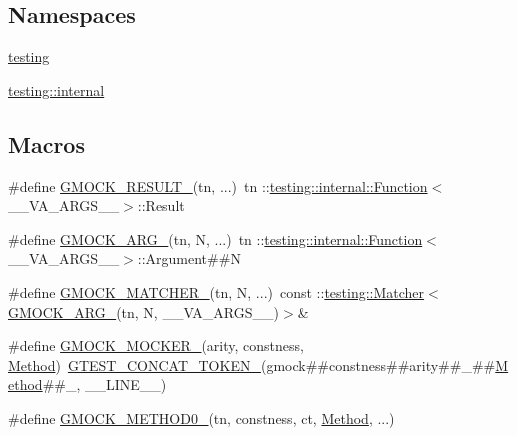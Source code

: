 \subsection*{Namespaces}
\begin{DoxyCompactItemize}
\item 
 \hyperlink{namespacetesting}{testing}
\item 
 \hyperlink{namespacetesting_1_1internal}{testing\+::internal}
\end{DoxyCompactItemize}
\subsection*{Macros}
\begin{DoxyCompactItemize}
\item 
\#define \hyperlink{gmock-generated-function-mockers_8h_a0e9d94e9c77df84f1103af06feee1077}{G\+M\+O\+C\+K\+\_\+\+R\+E\+S\+U\+L\+T\+\_\+}(tn, ...)~tn \+::\hyperlink{structtesting_1_1internal_1_1_function}{testing\+::internal\+::\+Function}$<$\+\_\+\+\_\+\+V\+A\+\_\+\+A\+R\+G\+S\+\_\+\+\_\+$>$\+::Result
\item 
\#define \hyperlink{gmock-generated-function-mockers_8h_a887575cc1c31158fba808180a10c004f}{G\+M\+O\+C\+K\+\_\+\+A\+R\+G\+\_\+}(tn,  N, ...)~tn \+::\hyperlink{structtesting_1_1internal_1_1_function}{testing\+::internal\+::\+Function}$<$\+\_\+\+\_\+\+V\+A\+\_\+\+A\+R\+G\+S\+\_\+\+\_\+$>$\+::Argument\#\#N
\item 
\#define \hyperlink{gmock-generated-function-mockers_8h_aa87d0009fe91f1c89d658776b55a769c}{G\+M\+O\+C\+K\+\_\+\+M\+A\+T\+C\+H\+E\+R\+\_\+}(tn,  N, ...)~const \+::\hyperlink{classtesting_1_1_matcher}{testing\+::\+Matcher}$<$\hyperlink{gmock-generated-function-mockers_8h_a887575cc1c31158fba808180a10c004f}{G\+M\+O\+C\+K\+\_\+\+A\+R\+G\+\_\+}(tn, N, \+\_\+\+\_\+\+V\+A\+\_\+\+A\+R\+G\+S\+\_\+\+\_\+)$>$\&
\item 
\#define \hyperlink{gmock-generated-function-mockers_8h_a7d362499e27b1bc3a9806dd3cf58a5b7}{G\+M\+O\+C\+K\+\_\+\+M\+O\+C\+K\+E\+R\+\_\+}(arity,  constness,  \hyperlink{gmock-spec-builders__test_8cc_a95606368148f3e5aab5db46c32466afd}{Method})~\hyperlink{gtest-internal_8h_ae3c336cbe1ae2bd1b1d019333e4428a0}{G\+T\+E\+S\+T\+\_\+\+C\+O\+N\+C\+A\+T\+\_\+\+T\+O\+K\+E\+N\+\_\+}(gmock\#\#constness\#\#arity\#\#\+\_\+\#\#\hyperlink{gmock-spec-builders__test_8cc_a95606368148f3e5aab5db46c32466afd}{Method}\#\#\+\_\+, \+\_\+\+\_\+\+L\+I\+N\+E\+\_\+\+\_\+)
\item 
\#define \hyperlink{gmock-generated-function-mockers_8h_ae0d290ffa58d7c624b2e3487ba1252f4}{G\+M\+O\+C\+K\+\_\+\+M\+E\+T\+H\+O\+D0\+\_\+}(tn,  constness,  ct,  \hyperlink{gmock-spec-builders__test_8cc_a95606368148f3e5aab5db46c32466afd}{Method}, ...)

\end{DoxyCompactItemize}
